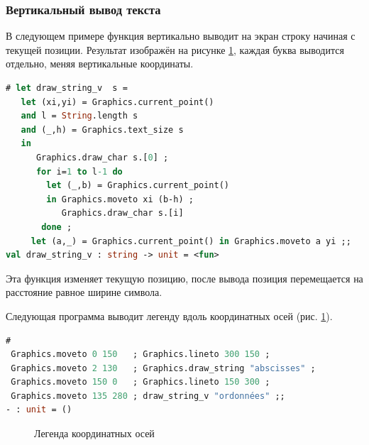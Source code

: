 \subsubsection{Вертикальный вывод текста}

В следующем примере функция  вертикально выводит на экран 
строку начиная с текущей позиции. Результат изображён на рисунке 
\ref{fig:legend_around_axes}, каждая буква выводится отдельно, меняя 
вертикальные координаты.

\begin{lstlisting}[language=OCaml]
# let draw_string_v  s = 
   let (xi,yi) = Graphics.current_point() 
   and l = String.length s 
   and (_,h) = Graphics.text_size s 
   in 
      Graphics.draw_char s.[0] ;
      for i=1 to l-1 do
        let (_,b) = Graphics.current_point() 
        in Graphics.moveto xi (b-h) ;
           Graphics.draw_char s.[i] 
       done ;
     let (a,_) = Graphics.current_point() in Graphics.moveto a yi ;;
val draw_string_v : string -> unit = <fun>
\end{lstlisting}

Эта функция изменяет текущую позицию, после вывода позиция перемещается на 
расстояние равное ширине символа.

Следующая программа выводит легенду вдоль координатных осей (рис. 
\ref{fig:legend_around_axes}).

\begin{lstlisting}[language=OCaml]
#
 Graphics.moveto 0 150   ; Graphics.lineto 300 150 ;
 Graphics.moveto 2 130   ; Graphics.draw_string "abscisses" ;
 Graphics.moveto 150 0   ; Graphics.lineto 150 300 ;
 Graphics.moveto 135 280 ; draw_string_v "ordonnées" ;;
- : unit = ()
\end{lstlisting}

\begin{figure}[h]
	\caption{\label{fig:legend_around_axes}Легенда координатных осей}
\end{figure}

